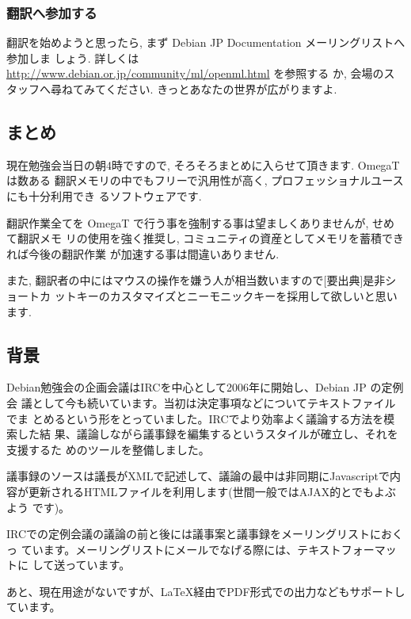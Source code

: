 \documentclass[mingoth,a4paper]{jsarticle}
\begin{document}
\subsubsection{翻訳へ参加する}
翻訳を始めようと思ったら, まず Debian JP Documentation メーリングリストへ参加しま
しょう. 詳しくは \url{http://www.debian.or.jp/community/ml/openml.html} を参照する
か, 会場のスタッフへ尋ねてみてください. きっとあなたの世界が広がりますよ.


\subsection{まとめ}
現在勉強会当日の朝4時ですので, そろそろまとめに入らせて頂きます. OmegaT は数ある
翻訳メモリの中でもフリーで汎用性が高く, プロフェッショナルユースにも十分利用でき
るソフトウェアです.

翻訳作業全てを OmegaT で行う事を強制する事は望ましくありませんが, せめて翻訳メモ
リの使用を強く推奨し, コミュニティの資産としてメモリを蓄積できれば今後の翻訳作業
が加速する事は間違いありません.

また, 翻訳者の中にはマウスの操作を嫌う人が相当数いますので[要出典]是非ショートカ
ットキーのカスタマイズとニーモニックキーを採用して欲しいと思います.


\subsection{背景}

Debian勉強会の企画会議はIRCを中心として2006年に開始し、Debian JP の定例会
議として今も続いています。当初は決定事項などについてテキストファイルでま
とめるという形をとっていました。IRCでより効率よく議論する方法を模索した結
果、議論しながら議事録を編集するというスタイルが確立し、それを支援するた
めのツールを整備しました。

議事録のソースは議長がXMLで記述して、議論の最中は非同期にJavascriptで内
容が更新されるHTMLファイルを利用します(世間一般ではAJAX的とでもよぶよう
です)。

IRCでの定例会議の議論の前と後には議事案と議事録をメーリングリストにおくっ
ています。メーリングリストにメールでなげる際には、テキストフォーマットに
して送っています。

あと、現在用途がないですが、\LaTeX 経由でPDF形式での出力などもサポートし
ています。
\end{document}
